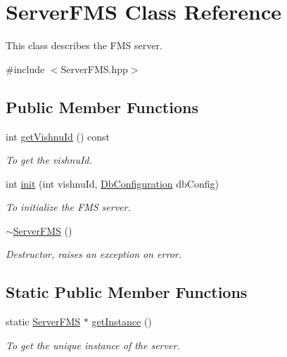 \hypertarget{classServerFMS}{
\section{ServerFMS Class Reference}
\label{classServerFMS}
}


This class describes the FMS server.  




{\ttfamily \#include $<$ServerFMS.hpp$>$}

\subsection*{Public Member Functions}
\begin{DoxyCompactItemize}
\item 
int \hyperlink{classServerFMS_a31f4e151bb28e25e39bd6b62012414e1}{getVishnuId} () const 
\begin{DoxyCompactList}\small\item\em To get the vishnuId. \item\end{DoxyCompactList}\item 
int \hyperlink{classServerFMS_a5f69177c06e70ec5f9f53bdf0be160d0}{init} (int vishnuId, \hyperlink{classDbConfiguration}{DbConfiguration} dbConfig)
\begin{DoxyCompactList}\small\item\em To initialize the FMS server. \item\end{DoxyCompactList}\item 
\hypertarget{classServerFMS_ae8ddf3643640877adca83db45aaab0ee}{
\hyperlink{classServerFMS_ae8ddf3643640877adca83db45aaab0ee}{$\sim$ServerFMS} ()}
\label{classServerFMS_ae8ddf3643640877adca83db45aaab0ee}

\begin{DoxyCompactList}\small\item\em Destructor, raises an exception on error. \item\end{DoxyCompactList}\end{DoxyCompactItemize}
\subsection*{Static Public Member Functions}
\begin{DoxyCompactItemize}
\item 
\hypertarget{classServerFMS_a797a9cefc565ea73c6af44fe366437f3}{
static \hyperlink{classServerFMS}{ServerFMS} $\ast$ \hyperlink{classServerFMS_a797a9cefc565ea73c6af44fe366437f3}{getInstance} ()}
\label{classServerFMS_a797a9cefc565ea73c6af44fe366437f3}

\begin{DoxyCompactList}\small\item\em To get the unique instance of the server. \item\end{DoxyCompactList}\end{DoxyCompactItemize}
